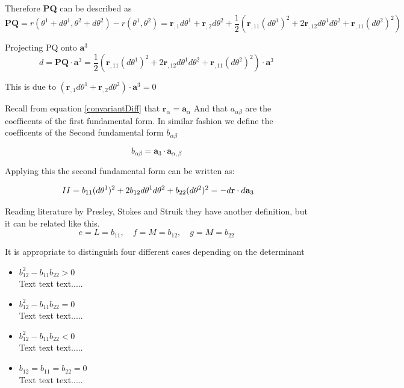 Therefore \textbf{PQ} can be described as
$$
\textbf{PQ} = r(\theta^1 + d\theta^1, \theta^2 + d\theta^2) - r(\theta^1, \theta^2) =  \textbf{r}_{,1} d\theta^1 + \textbf{r}_{,2} d\theta^2 + \frac{1}{2}(\textbf{r}_{,11}(d\theta^1)^2 + 2\textbf{r}_{,12}d\theta^1 d\theta^2 + \textbf{r}_{,11}(d\theta^2)^2) 
$$

Projecting PQ onto $\textbf{a}^3$ 
$$
d = \textbf{PQ}\cdot\textbf{a}^3 = \frac{1}{2}(\textbf{r}_{,11}(d\theta^1)^2 + 2\textbf{r}_{,12}d\theta^1 d\theta^2 + \textbf{r}_{,11}(d\theta^2)^2) \cdot \textbf{a}^3 
$$

This is due to $(\textbf{r}_{,1} d\theta^1 + \textbf{r}_{,2}d\theta^2)\cdot\textbf{a}^3 = 0$

Recall from equation \ref{convariantDiff} that $\textbf{r}_\alpha = \textbf{a}_\alpha$ And that $a_{\alpha\beta}$ are the coefficents of the first fundamental form. In similar fashion we define the coefficents of the Second fundamental form $b_{\alpha\beta}$ 

\begin{equation}
b_{\alpha\beta} = \textbf{a}_3 \cdot \textbf{a}_{\alpha,\beta} 
\end{equation}

Applying this the second fundamental form can be written as:

$$ ~\upperRomannumeral{2} = b_{11}(d\theta^1)^2 + 2b_{12}d\theta^1 d\theta^2 + b_{22}(d\theta^2)^2 = -d\textbf{r}\cdot d\textbf{a}_3$$

Reading literature by Presley, Stokes and Struik they have another definition, but it can be related like this.
$$ e = L = b_{11} ,\quad  f= M = b_{12},\quad
 g = M = b_{22}$$


It is appropriate to distinguish four different cases depending on the determinant

\begin{itemize}
\item $b_{12}^2 - b_{11}b_{22} > 0$ \\
Text text text.....
\item $b_{12}^2 - b_{11}b_{22} = 0$ \\
Text text text.....
\item $b_{12}^2 - b_{11}b_{22} < 0$ \\
Text text text.....
\item $b_{12} = b_{11} = b_{22} = 0$ \\
Text text text.....
\end{itemize}



